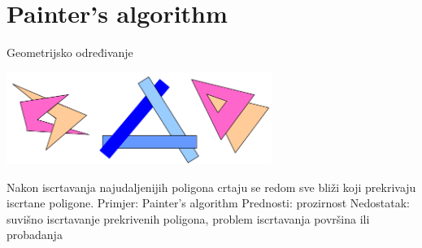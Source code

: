 \documentclass[9pt]{beamer}
\begin{document}
\section{Painter's algorithm}

\begin{frame}{Geometrijsko određivanje}
	
	\begin{center}
		\includegraphics[height=3cm]{slike/03_geometrija_1.png}
	\end{center}
	Nakon iscrtavanja najudaljenijih poligona crtaju se redom sve bliži koji prekrivaju iscrtane poligone. 
	Primjer: Painter's algorithm
	Prednosti: prozirnost
	Nedostatak: suvišno iscrtavanje prekrivenih poligona, problem iscrtavanja površina ili probadanja
\end{frame}
\end{document}
